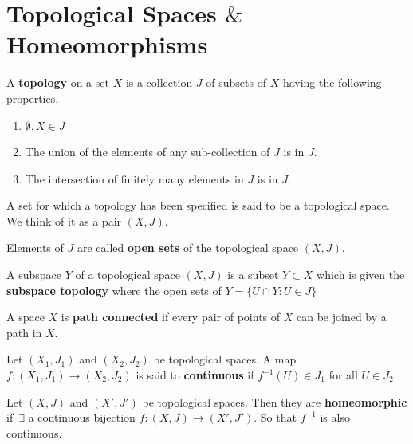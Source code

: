 \documentclass[12pt]{amsart}
\begin{document}


\section{Topological Spaces $\&$ Homeomorphisms}

\begin{definition}
    A \textbf{topology} on a set $X$ is a collection $J$ of subsets of $X$ having the following properties. 
    \begin{enumerate}
        \item $\emptyset, X \in J$ 
        \item The union of the elements of any sub-collection of $J$ is in $J$. 
        \item The intersection of finitely many elements in $J$ is in $J$. 
    \end{enumerate}
    A set for which a topology has been specified is said to be a topological space. We think of it as a pair $(X, J)$. 
\end{definition}

\begin{definition}
     Elements of $J$ are called \textbf{open sets} of the topological space $(X, J)$.
\end{definition}

\begin{definition}
     A subspace $Y$ of a topological space $(X, J)$ is a subset $Y \subset X$ which is given the \textbf{subspace topology} where the open sets of $Y = \{U \cap Y : U \in J\}$
\end{definition}

\begin{definition}
    A space $X$ is \textbf{path connected} if every pair of points of $X$ can be joined by a path in $X$. 
\end{definition}

\begin{definition}
    Let $(X_1, J_1)$ and $(X_2, J_2)$ be topological spaces. A map $f: (X_1, J_1) \to (X_2, J_2)$ is said to \textbf{continuous} if $f^{-1} (U) \in J_1$ for all $U \in J_2$.    
\end{definition}

\begin{definition}
     Let $(X, J)$ and $(X', J')$ be topological spaces. Then they are \textbf{homeomorphic} if $\, \exists$ a continuous bijection $f: (X, J) \to (X', J')$. So that $f^{-1}$ is also continuous. 
\end{definition}
\end{document}

